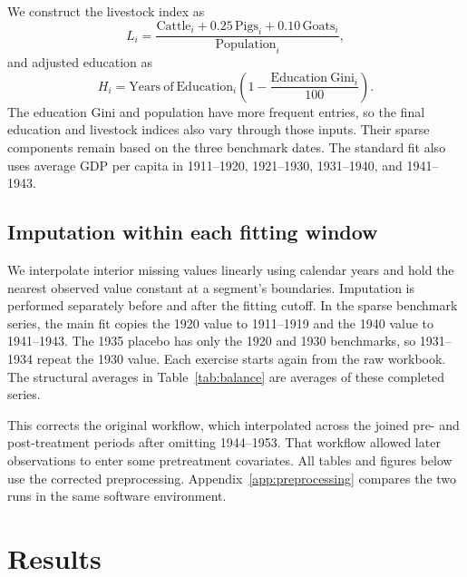 \documentclass[12pt]{article}
\begin{document}
\begin{table}[htbp]
\centering
\caption{Available workbook entries per country in the two fitting windows}
\label{tab:availability}
\small

\caption*{\footnotesize Ranges describe differences across the ten countries. The first four rows use 1920, 1930, and 1940 for the main fit, and 1920 and 1930 for the 1935 placebo fit.}
\end{table}

We construct the livestock index as
\begin{equation}
 L_i=\frac{\mathrm{Cattle}_i+0.25\,\mathrm{Pigs}_i+0.10\,\mathrm{Goats}_i}
 {\mathrm{Population}_i},
\end{equation}
and adjusted education as
\begin{equation}
 H_i=\mathrm{Years\ of\ Education}_i
 \left(1-\frac{\mathrm{Education\ Gini}_i}{100}\right).
\end{equation}
The education Gini and population have more frequent entries, so the final education and livestock indices also vary through those inputs. Their sparse components remain based on the three benchmark dates. The standard fit also uses average GDP per capita in 1911--1920, 1921--1930, 1931--1940, and 1941--1943.

\subsection{Imputation within each fitting window}
We interpolate interior missing values linearly using calendar years and hold the nearest observed value constant at a segment's boundaries. Imputation is performed separately before and after the fitting cutoff. In the sparse benchmark series, the main fit copies the 1920 value to 1911--1919 and the 1940 value to 1941--1943. The 1935 placebo has only the 1920 and 1930 benchmarks, so 1931--1934 repeat the 1930 value. Each exercise starts again from the raw workbook. The structural averages in Table~\ref{tab:balance} are averages of these completed series.

This corrects the original workflow, which interpolated across the joined pre- and post-treatment periods after omitting 1944--1953. That workflow allowed later observations to enter some pretreatment covariates. All tables and figures below use the corrected preprocessing. Appendix~\ref{app:preprocessing} compares the two runs in the same software environment.

\section{Results}
\end{document}
